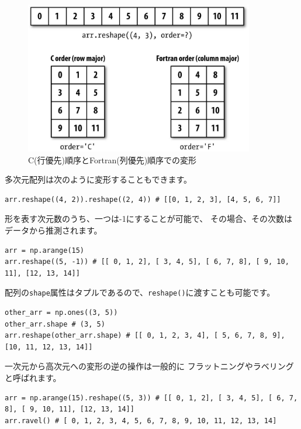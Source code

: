 \documentclass{jsarticle}
\begin{document}
            \begin{figure}[h]
                \centering
                \includegraphics[width=10cm]{images/A-3.jpg}
                \caption{C(行優先)順序とFortran(列優先)順序での変形}
                \label{fig:A-3}
            \end{figure}

            多次元配列は次のように変形することもできます。

            \begin{lstlisting}
arr.reshape((4, 2)).reshape((2, 4)) # [[0, 1, 2, 3], [4, 5, 6, 7]]\end{lstlisting}

            形を表す次元数のうち、一つは-1にすることが可能で、
            その場合、その次数はデータから推測されます。

            \begin{lstlisting}
arr = np.arange(15)
arr.reshape((5, -1)) # [[ 0, 1, 2], [ 3, 4, 5], [ 6, 7, 8], [ 9, 10, 11], [12, 13, 14]]\end{lstlisting}

            配列の\verb|shape|属性はタプルであるので、\verb|reshape()|に渡すことも可能です。

            \begin{lstlisting}
other_arr = np.ones((3, 5))
other_arr.shape # (3, 5)
arr.reshape(other_arr.shape) # [[ 0, 1, 2, 3, 4], [ 5, 6, 7, 8, 9], [10, 11, 12, 13, 14]]\end{lstlisting}

            一次元から高次元への変形の逆の操作は一般的に
            フラットニングやラベリングと呼ばれます。

            \begin{lstlisting}
arr = np.arange(15).reshape((5, 3)) # [[ 0, 1, 2], [ 3, 4, 5], [ 6, 7, 8], [ 9, 10, 11], [12, 13, 14]]
arr.ravel() # [ 0, 1, 2, 3, 4, 5, 6, 7, 8, 9, 10, 11, 12, 13, 14]\end{lstlisting}
\end{document}
